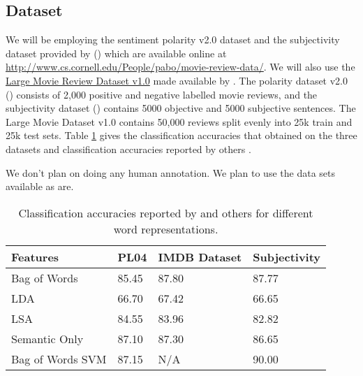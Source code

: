 \documentclass[11pt, oneside]{article}   	%
\begin{document}
\subsection*{Dataset}
We will be employing the sentiment polarity v2.0 dataset and the subjectivity dataset provided by (\cite{pang2004sentimental}) which are available online at \url{http://www.cs.cornell.edu/People/pabo/movie-review-data/}. We will also use the \href{http://ai.stanford.edu/~amaas/data/sentiment/}{Large Movie Review Dataset v1.0} made available by \cite{maas2011learning}. The polarity dataset v2.0 (\cite{pang2004sentimental}) consists of 2,000 positive and negative labelled movie reviews, and the subjectivity dataset (\cite{pang2004sentimental}) contains 5000 objective and 5000 subjective sentences. The Large Movie Dataset v1.0 \cite{maas2011learning}contains 50,000 reviews split evenly into 25k train and 25k test sets. Table \ref{table:1} gives the classification accuracies that \cite{maas2011learning} obtained on the three datasets and classification accuracies reported by others \cite{sadeghianbag}.

We don't plan on doing any human annotation. We plan to use the data sets available as are.

\begin{table}[H]
\begin{tabular}{ | l | p{1.5cm} | p{3cm} | p{3cm} |  }
 \hline
 \textbf{Features} & \textbf{PL04} & \textbf{IMDB Dataset} & \textbf{Subjectivity} \\
 \hline
 Bag of Words   & 85.45 & 87.80 & 87.77 \\
 LDA & 66.70 & 67.42 & 66.65 \\
 LSA & 84.55 & 83.96 & 82.82 \\
 Semantic Only & 87.10 & 87.30 & 86.65 \\
 Bag of Words SVM \cite{pang2004sentimental} & 87.15 & N/A & 90.00 \\
 \hline
\end{tabular}
\caption{Classification accuracies reported by \cite{maas2011learning} and others for different word representations.}
\label{table:1}
\end{table}



\end{document}
